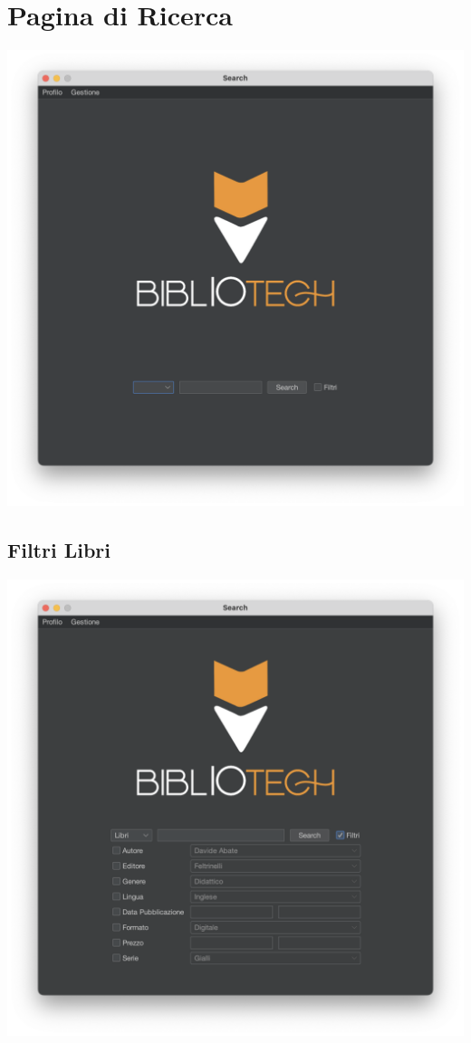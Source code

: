 \section{Pagina di Ricerca}
\includegraphics[scale=0.45]{Immagini/Schermate/Search/SearchPage.png}
\subsection{Filtri Libri}
\includegraphics[scale=0.45]{Immagini/Schermate/Search/SearchPage-FiltriLibro.png}
